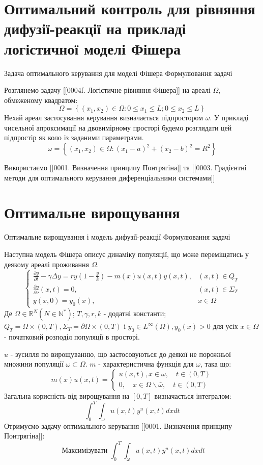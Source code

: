 \documentclass[a4paper,12pt]{extreport}
\begin{document}
\section{Оптимальний контроль для рівняння дифузії-реакції на прикладі логістичної моделі Фішера}
Задача оптимального керування для моделі Фішера
Формулювання задачі

Розглянемо задачу [[0004f. Логістичне рівняння Фішера]] на ареалі $\Omega$, обмеженому квадратом:
$$
\Omega=\left\{\left(x_1, x_2\right) \in \Omega: 0 \leq x_1 \leq L ; 0 \leq x_2 \leq L\right \}
$$
Нехай ареал застосування керування визначається підпростором $\omega$. У прикладі чисельної апроксимації на двовимірному просторі будемо розглядати цей підпростір як коло із заданими параметрами.
$$
\omega=\left\{\left(x_1, x_2\right) \in \Omega:\left(x_1-a\right)^2+\left(x_2-b\right)^2=R^2\right\}
$$

Використаємо [[0001. Визначення принципу Понтрягіна]] та [[0003. Градієнтні методи для оптимального керування диференціальними системами]]
\section{Оптимальне вирощування}
Оптимальне вирощування і модель дифузії-реакції
Формулювання задачі


Наступна модель Фішера описує динаміку популяції, що може переміщатись у деякому ареалі проживання $\Omega$.
$$
\begin{cases}\frac{\partial y}{\partial t}-\gamma \Delta y=r y\left(1-\frac{y}{k}\right)-m(x) u(x, t) y(x, t), & (x, t) \in Q_T \\ \frac{\partial y}{\partial \nu}(x, t)=0, & (x, t) \in \Sigma_T \\ y(x, 0)=y_0(x), & x \in \Omega\end{cases}
$$
Де  $\Omega \in \mathbb{R}^N\left(N \in \mathbb{N}^*\right)$; $T, \gamma, r, k$ - додатні константи; $Q_T=\Omega \times(0, T), \Sigma_T=\partial \Omega \times(0, T)$ і 
$y_0 \in L^{\infty}(\Omega), y_0(x)>0 \text { для усіх } x \in \Omega$ - початковий розподіл популяції в просторі. 

$u$ - зусилля по вирощуванню, що застосовуються до деякої не порожньої множини популяції $\omega \subset \Omega$. 
$m$ - характеристична функція для $\omega$, така що:
$$
m(x) u(x, t)=\left\{\begin{array}{l}
u(x, t), x \in \omega, \quad t \in(0, T) \\
0, \quad x \in \Omega \backslash \bar{\omega}, \quad t \in(0, T)
\end{array}\right.
$$
Загальна корисність від вирощування на $[0, T]$ визначається інтегралом:
$$
\int_0^T \int_\omega u(x, t) y^u(x, t) d x d t
$$
Отримуємо задачу оптимального керування [[0001. Визначення принципу Понтрягіна]]:
$$
\text { Максимізувати } \int_0^T \int_\omega u(x, t) y^u(x, t) d x d t
$$
\end{document}
